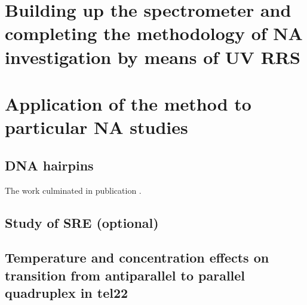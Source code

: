 \chapter[%
	Building up the spectrometer and completing the methodology of NA
	investigation by means of UV RRS
]{%
	Building up the spectrometer and completing the methodology of NA
	investigation by means of UV RRS
}
\label{spectrometer_building}








\chapter[%
	Application of the method to particular NA studies
]{%
	Application of the method to particular NA studies
}




\section{DNA hairpins}

The work culminated in publication \textcite{Klener2021}.

\section{Study of SRE (optional)}

\section[%
	Temperature and concentration effects on transition from antiparallel	to
	parallel quadruplex in tel22 (optional)
]{%
	Temperature and concentration effects on transition from antiparallel to
	parallel\\quadruplex in tel22
}
